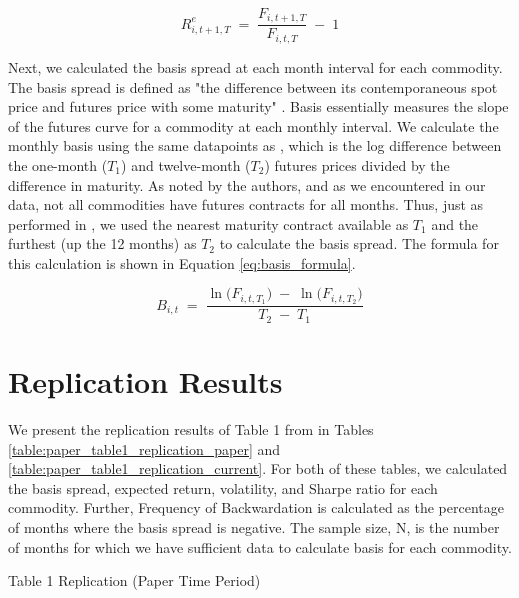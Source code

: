 \documentclass[12pt]{article}
\begin{document}
\begin{equation}
  R^e_{i,t+1,T} \;=\; \frac{F_{i,t+1,T}}{F_{i,t,T}} \;-\; 1
  \label{eq:return_formula}
\end{equation}

Next, we calculated the basis spread at each month interval for each commodity. The basis spread is defined as "the difference between its contemporaneous spot price and futures price with some maturity" \cite{Yang2013}.
Basis essentially measures the slope of the futures curve for a commodity at each monthly interval.
We calculate the monthly basis using the same datapoints as \cite{Yang2013}, which is the log difference between the one-month ($T_1$) and twelve-month ($T_2$) futures prices divided by the difference in maturity.
As noted by the authors, and as we encountered in our data, not all commodities have futures contracts for all months.
Thus, just as performed in \cite{Yang2013}, we used the nearest maturity contract available as $T_1$ and the furthest (up the 12 months) as $T_2$ to calculate the basis spread.
The formula for this calculation is shown in Equation \ref{eq:basis_formula}.

\begin{equation}
    B_{i,t} \;=\; \frac{\ln\bigl(F_{i,t,T_1}\bigr)\;-\;\ln\bigl(F_{i,t,T_2}\bigr)}{\,T_2 \;-\; T_1\,}
  \label{eq:basis_formula}
\end{equation}


\newpage
\section{Replication Results}

We present the replication results of Table 1 from \cite{Yang2013} in Tables \ref{table:paper_table1_replication_paper} and \ref{table:paper_table1_replication_current}.
For both of these tables, we calculated the basis spread, expected return, volatility, and Sharpe ratio for each commodity.
Further, Frequency of Backwardation is calculated as the percentage of months where the basis spread is negative.
The sample size, N, is the number of months for which we have sufficient data to calculate basis for each commodity.


\begin{table}[ht!]
    \caption{Table 1 Replication (Paper Time Period)}
    \centering
    \begin{adjustbox}{max width=\textwidth}
    
    \end{adjustbox}
    \label{table:paper_table1_replication_paper}
\end{table}
\end{document}
